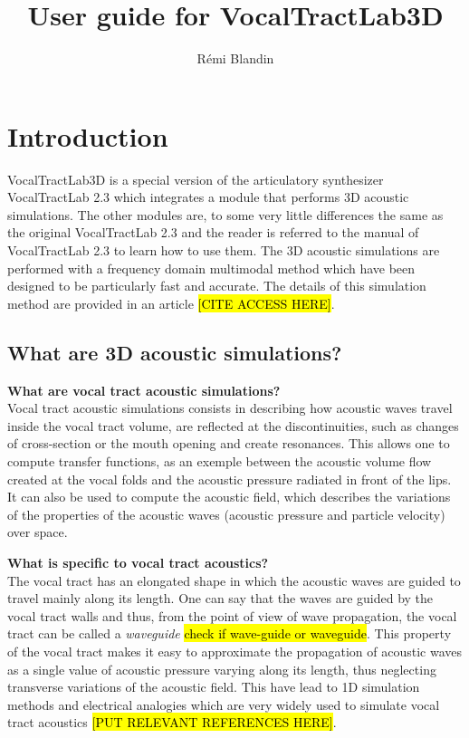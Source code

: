 \documentclass[]{article}
\title{User guide for VocalTractLab3D}
\author{R{\'e}mi Blandin}
\begin{document}
	\maketitle
	
	\section{Introduction}
	
	VocalTractLab3D is a special version of the articulatory synthesizer
	VocalTractLab 2.3 which integrates a module that performs 3D acoustic simulations. The other modules are, to some very little differences the same as the original VocalTractLab 2.3 and the 
	reader is referred to the manual of VocalTractLab 2.3 to learn
	how to use them.
	The 3D acoustic simulations are performed with a frequency domain
	multimodal method which have been designed to be particularly 
	fast and accurate. The details of this simulation method are 
	provided in an article \hl{[CITE ACCESS HERE]}.
	
	\subsection{What are 3D acoustic simulations?}
	
	\textbf{What are vocal tract acoustic simulations?}\\ 
	Vocal tract acoustic simulations consists in describing how acoustic waves travel
	inside the vocal tract volume, are reflected at the discontinuities, such as 
	changes of cross-section or the mouth opening and create resonances. 
	This allows one to compute transfer functions, as an exemple between the acoustic volume flow created at the vocal folds and the acoustic pressure radiated in front of the lips. It can also be used to 
	compute the acoustic field, which describes the variations of the  
	properties of the acoustic waves (acoustic pressure and particle velocity) over space.
	
	\textbf{What is specific to vocal tract acoustics?}\\
	The vocal tract has an elongated shape in which the acoustic waves 
	are guided to travel mainly along its length. One can say that the
	waves are guided by the vocal tract walls and thus, from the point
	of view of wave propagation, the vocal tract can be called a 
	\emph{waveguide} \hl{check if wave-guide or waveguide}.
	This property of the vocal tract makes it easy to approximate the 
	propagation of acoustic waves as a single value of acoustic 
	pressure varying along its length, thus neglecting transverse 
	variations of the acoustic field. This have lead to 1D simulation 
	methods and electrical analogies which are very widely used to 
	simulate vocal tract acoustics \hl{[PUT RELEVANT REFERENCES HERE]}.
	
\end{document}
